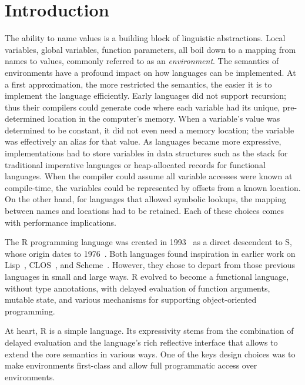 \documentclass[10pt,sigplan,authorversion=true]{acmart}
\begin{document}
\maketitle
\section{Introduction}

The ability to name values is a building block of linguistic abstractions. Local
variables, global variables, function parameters, all boil down to a mapping
from names to values, commonly referred to as an \emph{environment}. The
semantics of environments have a profound impact on how languages can be
implemented. At a first approximation, the more restricted the semantics, the
easier it is to implement the language efficiently. Early languages did not
support recursion; thus their compilers could generate code where each variable
had its unique, pre-determined location in the computer's memory. When a
variable's value was determined to be constant, it did not even need a memory
location; the variable was effectively an alias for that value. As languages
became more expressive, implementations had to store variables in data
structures such as the stack for traditional imperative languages or
heap-allocated records for functional languages. When the compiler could assume
all variable accesses were known at compile-time, the variables could be
represented by offsets from a known location. On the other hand, for
languages that allowed symbolic lookups, the mapping between names and locations
had to be retained. Each of these choices comes with performance implications.

The R programming language was created in 1993~\cite{r96} as a direct descendent
to S, whose origin dates to 1976~\cite{s88}. Both languages found inspiration in
earlier work on Lisp~\cite{Lisp}, CLOS~\cite{CLOS}, and
Scheme~\cite{SchemeR5RS}. However, they chose to depart from those previous
languages in small and large ways. R evolved to become a functional language,
without type annotations, with delayed evaluation of function arguments, mutable
state, and various mechanisms for supporting object-oriented programming.

At heart, R is a simple language. Its expressivity stems from the combination of
delayed evaluation and the language's rich reflective interface that allows to
extend the core semantics in various ways. One of the keys design choices was to
make environments first-class and allow full programmatic access over
environments.
\end{document}
